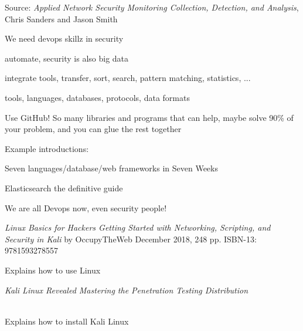 \documentclass[Screen16to9,17pt]{foils}
\begin{document}
Source: \emph{Applied Network Security Monitoring Collection, Detection, and Analysis}, Chris Sanders and Jason Smith



\begin{list1}
\item We need devops skillz in security
\item automate, security is also big data
\item integrate tools, transfer, sort, search, pattern matching, statistics, ...
\item tools, languages, databases, protocols, data formats
\item Use GitHub! So many libraries and programs that can help, maybe solve  90\% of your problem, and you can glue the rest together
\item Example introductions:
\begin{list2}
\item Seven languages/database/web frameworks in Seven Weeks
\item Elasticsearch the definitive guide
\end{list2}
\end{list1}

\centerline{We are all Devops now, even security people!}



\myquestionspage






\emph{Linux Basics for Hackers
Getting Started with Networking, Scripting, and Security in Kali}
by OccupyTheWeb
December 2018, 248 pp.
ISBN-13:
9781593278557

Explains how to use Linux



\emph{Kali Linux Revealed  Mastering the Penetration Testing Distribution}

\\
Explains how to install Kali Linux
\end{document}
